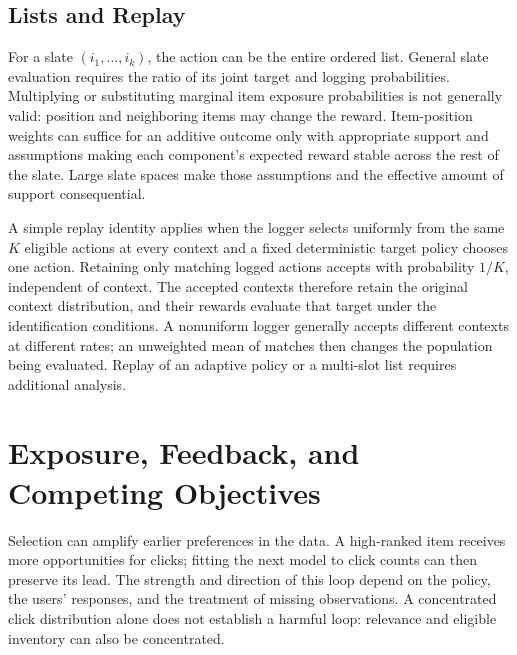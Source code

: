 \subsection{Lists and Replay}

For a slate $(i_1,\ldots,i_k)$, the action can be the entire ordered list. General slate evaluation requires the ratio of its joint target and logging probabilities. Multiplying or substituting marginal item exposure probabilities is not generally valid: position and neighboring items may change the reward. Item-position weights can suffice for an additive outcome only with appropriate support and assumptions making each component's expected reward stable across the rest of the slate. Large slate spaces make those assumptions and the effective amount of support consequential.

A simple replay identity applies when the logger selects uniformly from the same $K$ eligible actions at every context and a fixed deterministic target policy chooses one action. Retaining only matching logged actions accepts with probability $1/K$, independent of context. The accepted contexts therefore retain the original context distribution, and their rewards evaluate that target under the identification conditions. A nonuniform logger generally accepts different contexts at different rates; an unweighted mean of matches then changes the population being evaluated. Replay of an adaptive policy or a multi-slot list requires additional analysis.

\section{Exposure, Feedback, and Competing Objectives}
\label{sec:exposure-bias}

Selection can amplify earlier preferences in the data. A high-ranked item receives more opportunities for clicks; fitting the next model to click counts can then preserve its lead. The strength and direction of this loop depend on the policy, the users' responses, and the treatment of missing observations. A concentrated click distribution alone does not establish a harmful loop: relevance and eligible inventory can also be concentrated.

